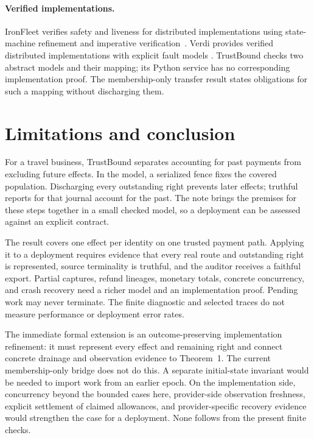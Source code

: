 \documentclass[11pt]{article}
\begin{document}
\paragraph{Verified implementations.}
IronFleet verifies safety and liveness for distributed implementations using
state-machine refinement and imperative verification~\cite{ironfleet2015}.
Verdi provides verified distributed implementations with explicit fault models
\cite{verdi2015}. TrustBound checks two abstract models and their mapping; its
Python service has no corresponding implementation proof. The membership-only
transfer result states obligations for such a mapping without discharging them.

\section{Limitations and conclusion}
For a travel business, TrustBound separates accounting for past payments from
excluding future effects. In the model, a serialized fence fixes the covered
population. Discharging every outstanding right prevents later effects;
truthful reports for that journal account for the past. The note brings the
premises for these steps together in a small checked model, so a deployment
can be assessed against an explicit contract.

The result covers one effect per identity on one trusted payment path.
Applying it to a deployment requires evidence that every real route and
outstanding right is represented, source terminality is truthful, and the
auditor receives a faithful export. Partial captures, refund lineages, monetary totals, concrete concurrency, and crash
recovery need a richer model and an implementation proof. Pending work may
never terminate. The finite diagnostic and selected traces do not measure
performance or deployment error rates.

The immediate formal extension is an outcome-preserving implementation
refinement: it must represent every effect and remaining right and connect
concrete drainage and observation evidence to Theorem~1. The current
membership-only bridge does not do this. A separate initial-state invariant
would be needed to import work from an earlier epoch. On the implementation
side, concurrency beyond the bounded cases here, provider-side observation freshness,
explicit settlement of claimed allowances, and provider-specific recovery evidence would strengthen
the case for a deployment. None follows from the present finite checks.
\end{document}
